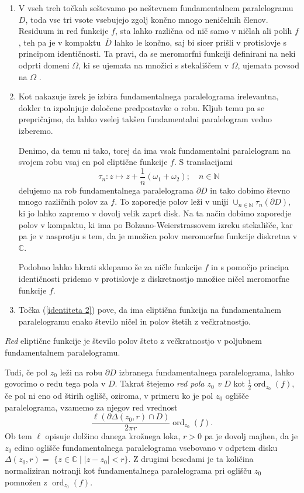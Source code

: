 \documentclass[mat1]{fmfdelo}
\newcommand{\N}{\mathbb N}
\newcommand{\C}{\mathbb C}
\newcommand{\om}{\omega}
\newcommand{\ord}[2]{\operatorname{ord}_{#1}(#2)}
\newcommand{\olsi}[1]{\,\overline{\!{#1}}} %
\theoremstyle{definition}
\begin{document}
\begin{opomba}
    \label{liouville opomba}
    \begin{enumerate}
        \item
        V vseh treh točkah seštevamo po neštevnem fundamentalnem paralelogramu $D$, toda vse tri vsote vsebujejo zgolj končno mnogo neničelnih členov. Residuum in red funkcije $f$, sta lahko različna od nič samo v ničlah ali polih $f$, teh pa je v kompaktu $\olsi{D}$ lahko le končno, saj bi sicer prišli v protislovje s principom identičnosti. Ta pravi, da se meromorfni funkciji definirani na neki odprti domeni $\Omega$, ki se ujemata na množici s stekališčem v $\Omega$, ujemata povsod na $\Omega$ \cite[]{}.
        \item 
        Kot nakazuje izrek je izbira fundamentalnega paralelograma irelevantna, dokler ta izpolnjuje določene predpostavke o robu. Kljub temu pa se prepričajmo, da lahko vselej takšen fundamentalni paralelogram vedno izberemo. 

        Denimo, da temu ni tako, torej da ima vsak fundamentalni paralelogram na svojem robu vsaj en pol eliptične funkcije $f$. S translacijami
        \[
            \tau_n : z \mapsto z + \frac{1}{n}(\om_1 + \om_2); \quad n\in \N
        \]
        delujemo na rob fundamentalnega paralelograma $\partial D$ in tako dobimo števno mnogo različnih polov za $f$. To zaporedje polov leži v uniji $\cup_{n \in \N} \tau_n(\partial D)$, ki jo lahko zapremo v dovolj velik zaprt disk. Na ta način dobimo zaporedje polov v kompaktu, ki ima po Bolzano-Weierstrassovem izreku stekališče, kar pa je v nasprotju s tem, da je množica polov meromorfne funkcije diskretna v $\C$. 
        
        Podobno lahko hkrati sklepamo še za ničle funkcije $f$ in s pomočjo principa identičnosti pridemo v protislovje z diskretnostjo množice ničel meromorfne funkcije $f$.
        \item 
        Točka (\ref{identiteta 2}) pove, da ima eliptična funkcija na fundamentalnem paralelogramu enako število ničel in polov štetih z večkratnostjo. 
    \end{enumerate}
\end{opomba}

\begin{definicija}
    \emph{Red} eliptične funkcije je število polov šteto z večkratnostjo v poljubnem fundamentalnem paralelogramu. 
\end{definicija}

Tudi, če pol $z_0$ leži na robu $\partial D$ izbranega fundamentalnega paralelograma, lahko govorimo o redu tega pola v $D$. Takrat štejemo \emph{red pola $z_0$ v $D$} kot $\frac{1}{2}\ord{z_0}{f}$, če pol ni eno od štirih oglišč, oziroma, v primeru ko je pol $z_0$ oglišče paralelograma, vzamemo za njegov red vrednost
\[
    \frac{\ell(\partial \Delta(z_0, r) \cap D)}{2 \pi r}\ord{z_0}{f}.
\]
Ob tem $\ell$ opisuje dolžino danega krožnega loka, $r > 0$ pa je dovolj majhen, da je $z_0$ edino oglišče fundamentalnega paralelograma vsebovano v odprtem disku ${\Delta(z_0, r) =}$ ${\{z \in \C \mid \left\lvert z - z_0 \right\rvert < r\}}$. Z drugimi besedami je ta količina normaliziran notranji kot fundamentalnega paralelograma pri oglišču $z_0$ pomnožen z $\ord{z_0}{f}$.  
\end{document}
